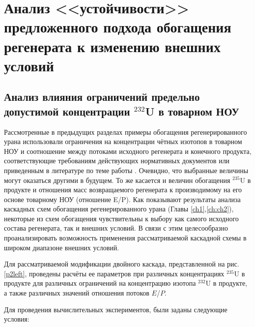 \section{Анализ <<устойчивости>> предложенного подхода обогащения регенерата к изменению внешних условий}
\subsection{Анализ влияния ограничений предельно допустимой концентрации $^{232}$U в товарном НОУ}

Рассмотренные в предыдущих разделах примеры обогащения регенерированного урана использовали ограничения на концентрации чётных изотопов в товарном НОУ и соотношение между потоками исходного регенерата и конечного продукта, соответствующие требованиям действующих нормативных документов или приведенным в литературе по теме работы \cite{smirnovKaskadnyeShemyZadachah2012}. Очевидно, что выбранные величины могут оказаться другими в будущем. То же касается и величин обогащения $^{235}$U в продукте и отношения масс возвращаемого регенерата к производимому на его основе товарному НОУ (отношение E/P). Как показывают результаты анализа каскадных схем обогащения регенерированного урана (Главы \ref{ch1},\ref{ch:ch2}), некоторые из схем обогащения чувствительны к выбору как самого исходного состава регенерата, так и внешних условий. В связи с этим целесообразно проанализировать возможность применения рассматриваемой каскадной схемы в широком диапазоне внешних условий.

Для рассматриваемой модификации двойного каскада, представленной на рис. \ref{p2left}, проведены расчёты ее параметров при различных концентрациях $^{235}$U в продукте для различных ограничений на концентрацию изотопа $^{232}$U в продукте, а также различных значений отношения потоков $E$/$P$.

Для проведения вычислительных экспериментов, были заданы следующие условия:

